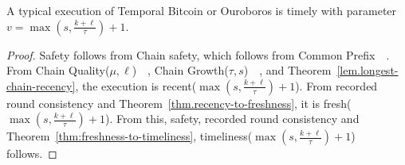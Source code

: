 \begin{corollary}
  A typical execution of Temporal Bitcoin or Ouroboros is timely with parameter
  $v = \max(s, \frac{k + \ell}{\tau}) + 1$.
\end{corollary}
\begin{proof}
  Safety follows from Chain safety, which follows from Common Prefix~\cite[Theorem 15]{backbone}~\cite[Theorem 4.31]{ouroboros}.
  From Chain Quality($\mu,\ell$)~\cite[Theorem 16]{backbone}~\cite[Lemma 4.19]{ouroboros},
  Chain Growth($\tau, s$)~\cite[Theorem 12]{backbone}~\cite[Lemma 4.22]{ouroboros}, and Theorem~\ref{lem.longest-chain-recency},
  the execution is recent($\max(s, \frac{k + \ell}{\tau}) + 1$).
  From recorded round consistency and Theorem~\ref{thm.recency-to-freshness}, it is
  fresh($\max(s, \frac{k + \ell}{\tau}) + 1$).
  From this, safety, recorded round consistency and Theorem~\ref{thm:freshness-to-timeliness},
  timeliness($\max(s, \frac{k + \ell}{\tau}) + 1$) follows.
  \Qed
\end{proof}
